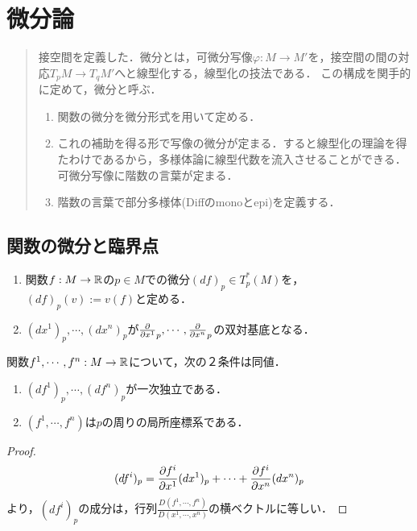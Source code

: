 \documentclass[uplatex,dvipdfmx]{jsreport}
\begin{document}
\section{微分論}

\begin{quote}
    接空間を定義した．微分とは，可微分写像$\varphi:M\to M'$を，接空間の間の対応$T_pM\to T_qM'$へと線型化する，線型化の技法である．
    この構成を関手的に定めて，微分と呼ぶ．
    \begin{enumerate}
        \item 関数の微分を微分形式を用いて定める．
        \item これの補助を得る形で写像の微分が定まる．すると線型化の理論を得たわけであるから，多様体論に線型代数を流入させることができる．可微分写像に階数の言葉が定まる．
        \item 階数の言葉で部分多様体(Diffのmonoとepi)を定義する．
    \end{enumerate}
\end{quote}

\subsection{関数の微分と臨界点}

\begin{definition}\mbox{}
    \begin{enumerate}
        \item 関数$f:M\to\mathbb{R}$の$p\in M$での微分$(df)_p\in T_p^*(M)$を，$(df)_p(v):=v(f)$と定める．
        \item $(dx^1)_p,\cdots,(dx^n)_p$が$\frac{\partial }{\partial x^1}_p,\cdots,\frac{\partial }{\partial x^n}_p$の双対基底となる．
    \end{enumerate}
\end{definition}

\begin{proposition}
    関数$f^1,\cdots,f^n:M\to\mathbb{R}$について，次の２条件は同値．
    \begin{enumerate}
        \item $(df^1)_p,\cdots,(df^n)_p$が一次独立である．
        \item $(f^1,\cdots,f^n)$は$p$の周りの局所座標系である．
    \end{enumerate}
\end{proposition}
\begin{proof}
    \[(df^i)_p=\frac{\partial f^i}{\partial x^1}(dx^1)_p+\cdots+\frac{\partial f^i}{\partial x^n}(dx^n)_p\]
    より，$(df^i)_p$の成分は，行列$\frac{D(f^1,\cdots,f^n)}{D(x^1,\cdots,x^n)}$の横ベクトルに等しい．
\end{proof}
\end{document}
